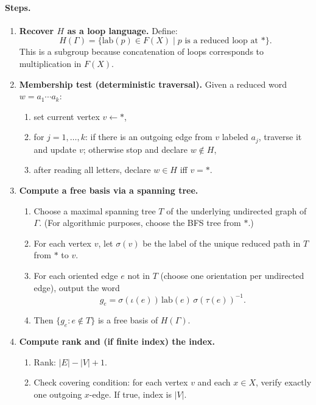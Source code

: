 \documentclass[11pt]{article}
\theoremstyle{definition}
\theoremstyle{plain}
\theoremstyle{remark}
\newcommand{\lab}{\mathrm{lab}}
\begin{document}
\paragraph{Steps.}
\begin{enumerate}[leftmargin=2.2em]
\item \textbf{Recover $H$ as a loop language.}
Define:
\[
H(\Gamma)=\{\lab(p)\in F(X)\mid p\text{ is a reduced loop at }*\}.
\]
This is a subgroup because concatenation of loops corresponds to multiplication in $F(X)$.

\item \textbf{Membership test (deterministic traversal).}
Given a reduced word $w=a_1\cdots a_k$:
\begin{enumerate}[leftmargin=2em]
\item set current vertex $v\leftarrow *$,
\item for $j=1,\dots,k$: if there is an outgoing edge from $v$ labeled $a_j$, traverse it and update $v$; otherwise stop and declare $w\notin H$,
\item after reading all letters, declare $w\in H$ iff $v=*$.
\end{enumerate}

\item \textbf{Compute a free basis via a spanning tree.}
\begin{enumerate}[leftmargin=2em]
\item Choose a maximal spanning tree $T$ of the underlying undirected graph of $\Gamma$.
(For algorithmic purposes, choose the BFS tree from $*$.)
\item For each vertex $v$, let $\sigma(v)$ be the label of the unique reduced path in $T$ from $*$ to $v$.
\item For each oriented edge $e$ not in $T$ (choose one orientation per undirected edge), output the word
\[
g_e=\sigma(\iota(e))\,\lab(e)\,\sigma(\tau(e))^{-1}.
\]
\item Then $\{g_e: e\notin T\}$ is a free basis of $H(\Gamma)$.
\end{enumerate}

\item \textbf{Compute rank and (if finite index) the index.}
\begin{enumerate}[leftmargin=2em]
\item Rank: $|E|-|V|+1$.
\item Check covering condition: for each vertex $v$ and each $x\in X$, verify exactly one outgoing $x$-edge.
If true, index is $|V|$.
\end{enumerate}
\end{enumerate}
\end{document}
